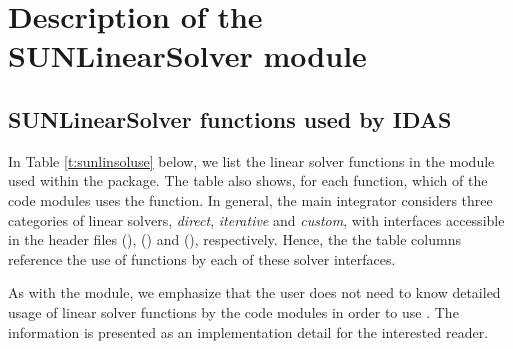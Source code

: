 \chapter{Description of the SUNLinearSolver module}\label{s:sunlinsol}



\section{SUNLinearSolver functions used by IDAS}

In Table \ref{t:sunlinsoluse} below, we list the linear solver
functions in the {\sunlinsol} module used within the {\idas} package.
The table also shows, for each function, which of the code modules uses
the function.  In general, the main {\idas} integrator considers
three categories of linear solvers, \emph{direct}, \emph{iterative}
and \emph{custom}, with interfaces accessible in the {\idas} header
files  ({\idadls}), 
({\idaspils}) and  ({\idacls}), respectively.
Hence, the the table columns reference the use of {\sunlinsol}
functions by each of these solver interfaces.

As with the {\sunmatrix} module, we emphasize that the {\idas} user
does not need to know detailed usage of linear solver functions by the
{\idas} code modules in order to use {\idas}. The information is
presented as an implementation detail for the interested reader.

